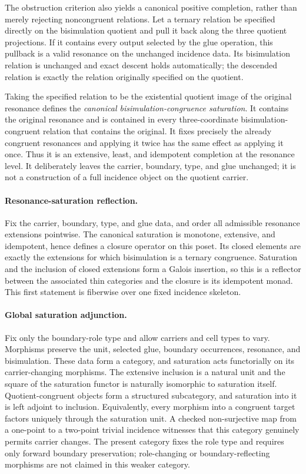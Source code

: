 \documentclass[11pt]{article}
\theoremstyle{definition}
\begin{document}
The obstruction criterion also yields a canonical positive completion, rather
than merely rejecting noncongruent relations.  Let a ternary relation be
specified directly on the bisimulation quotient and pull it back along the
three quotient projections.  If it contains every output selected by the glue
operation, this pullback is a valid resonance on the unchanged incidence data.
Its bisimulation relation is unchanged and exact descent holds automatically;
the descended relation is exactly the relation originally specified on the
quotient.

Taking the specified relation to be the existential quotient image of the
original resonance defines the \emph{canonical bisimulation-congruence
saturation}.  It contains the original resonance and is contained in every
three-coordinate bisimulation-congruent relation that contains the original.
It fixes precisely the already congruent resonances and applying it twice has
the same effect as applying it once.  Thus it is an extensive, least, and
idempotent completion at the resonance level.  It deliberately leaves the
carrier, boundary, type, and glue unchanged; it is not a construction of a full
incidence object on the quotient carrier.

\paragraph{Resonance-saturation reflection.}
Fix the carrier, boundary, type, and glue data, and order all admissible
resonance extensions pointwise.  The canonical saturation is monotone,
extensive, and idempotent, hence defines a closure operator on this poset.  Its
closed elements are exactly the extensions for which bisimulation is a ternary
congruence.  Saturation and the inclusion of closed extensions form a Galois
insertion, so this is a reflector between the associated thin categories and
the closure is its idempotent monad.  This first statement is fiberwise over
one fixed incidence skeleton.

\paragraph{Global saturation adjunction.}
Fix only the boundary-role type and allow carriers and cell types to vary.
Morphisms preserve the unit, selected glue, boundary occurrences, resonance,
and bisimulation.  These data form a category, and saturation acts
functorially on its carrier-changing morphisms.  The extensive inclusion is a
natural unit and the square of the saturation functor is naturally isomorphic
to saturation itself.  Quotient-congruent objects form a structured
subcategory, and saturation into it is left adjoint to inclusion.  Equivalently,
every morphism into a congruent target factors uniquely through the saturation
unit.  A checked non-surjective map from a one-point to a two-point trivial
incidence witnesses that this category genuinely permits carrier changes.  The
present category fixes the role type and requires only forward
boundary preservation; role-changing or boundary-reflecting morphisms are not
claimed in this weaker category.
\end{document}
